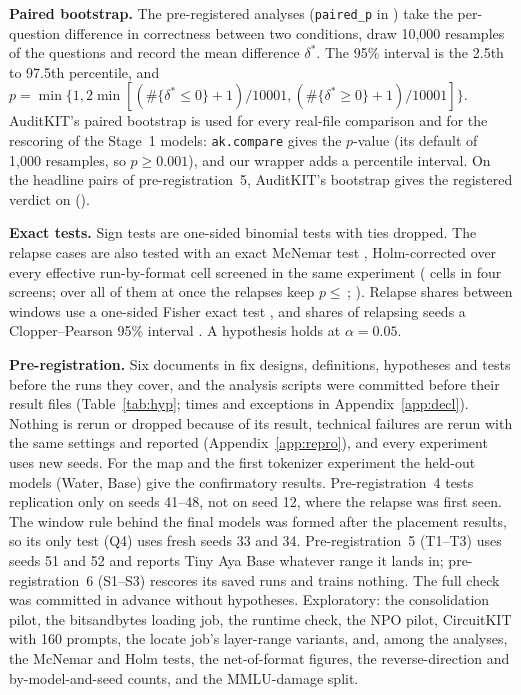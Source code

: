 \textbf{Paired bootstrap.} The pre-registered analyses (\texttt{paired\_p} in ) take the per-question difference in correctness between two conditions, draw 10,000 resamples of the questions and record the mean difference $\delta^{*}$. The 95\% interval is the 2.5th to 97.5th percentile, and $p=\min\{1, 2\min[(\#\{\delta^{*}\leq 0\}+1)/10001, (\#\{\delta^{*}\geq 0\}+1)/10001]\}$. AuditKIT's paired bootstrap \citep{efron1979bootstrap} is used for every real-file comparison and for the rescoring of the Stage~1 models: \texttt{ak.compare} gives the $p$-value (its default of 1,000 resamples, so $p\geq 0.001$), and our wrapper adds a percentile interval. On the \akPairs{} headline pairs of pre-registration~5, AuditKIT's bootstrap gives the registered verdict on \akSame{} ().

\textbf{Exact tests.} Sign tests \citep{dixon1946sign} are one-sided binomial tests with ties dropped. The relapse cases are also tested with an exact McNemar test \citep{mcnemar1947note}, Holm-corrected \citep{holm1979simple} over every effective run-by-format cell screened in the same experiment (\mcCells{} cells in four screens; over all of them at once the \mcRelapses{} relapses keep $p\leq$\,\mcPooledMax; ). Relapse shares between windows use a one-sided Fisher exact test \citep{fisher1922interpretation}, and shares of relapsing seeds a Clopper--Pearson 95\% interval \citep{clopper1934use}. A hypothesis holds at $\alpha=0.05$.

\textbf{Pre-registration.} Six documents in  fix designs, definitions, hypotheses and tests before the runs they cover, and the analysis scripts were committed before their result files (Table~\ref{tab:hyp}; times and exceptions in Appendix~\ref{app:decl}). Nothing is rerun or dropped because of its result, technical failures are rerun with the same settings and reported (Appendix~\ref{app:repro}), and every experiment uses new seeds. For the map and the first tokenizer experiment the held-out models (Water, Base) give the confirmatory results. Pre-registration~4 tests replication only on seeds 41--48, not on seed 12, where the relapse was first seen. The window rule behind the final models was formed after the placement results, so its only test (Q4) uses fresh seeds 33 and 34. Pre-registration~5 (T1--T3) uses seeds 51 and 52 and reports Tiny Aya Base whatever range it lands in; pre-registration~6 (S1--S3) rescores its saved runs and trains nothing. The full check was committed in advance without hypotheses. Exploratory: the consolidation pilot, the bitsandbytes loading job, the runtime check, the NPO pilot, CircuitKIT with 160 prompts, the locate job's layer-range variants, and, among the analyses, the McNemar and Holm tests, the net-of-format figures, the reverse-direction and by-model-and-seed counts, and the MMLU-damage split.

